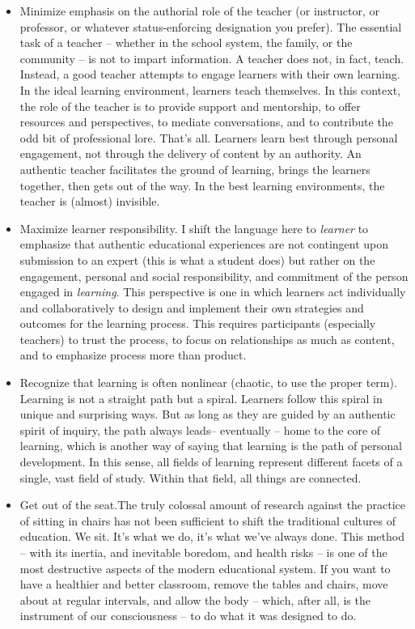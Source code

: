 \documentclass[10pt,DIV09,letterpaper,oneside,headsepline]{scrreprt}
\begin{document}
\begin{itemize}

\item Minimize emphasis on the authorial role of the teacher (or instructor, or professor, or whatever status-enforcing designation you prefer). The essential task of a teacher -- whether in the school system, the family, or the community -- is not to impart information. A teacher does not, in fact, teach. Instead, a good teacher attempts to engage learners with their own learning. In the ideal learning environment, learners teach themselves. In this context, the role of the teacher is to provide support and mentorship, to offer resources and perspectives, to mediate conversations, and to contribute the odd bit of professional lore. That’s all. Learners learn best through personal engagement, not through the delivery of content by an authority. An authentic teacher facilitates the ground of learning, brings the learners together, then gets out of the way. In the best learning environments, the teacher is (almost) invisible.

\item Maximize learner responsibility. I shift the language here to \textit{learner} to emphasize that authentic educational experiences are not contingent upon submission to an expert (this is what a student does) but rather on the engagement, personal and social responsibility, and commitment of the person engaged in \textit{learning}. This perspective is one in which learners act individually and collaboratively to design and implement their own strategies and outcomes for the learning process. This requires participants (especially teachers) to trust the process, to focus on relationships as much as content, and to emphasize process more than product.

\item Recognize that learning is often nonlinear (chaotic, to use the proper term). Learning is not a straight path but a spiral. Learners follow this spiral in unique and surprising ways. But as long as they are guided by an authentic spirit of inquiry, the path always leads-- eventually -- home to the core of learning, which is another way of saying that learning is the path of personal development. In this sense, all fields of learning represent different facets of a single, vast field of study. Within that field, all things are connected.

\item Get out of the seat.The truly colossal amount of research against the practice of sitting in chairs has not been sufficient to shift the traditional cultures of education. We sit. It's what we do, it's what we've always done. This method -- with its inertia, and inevitable boredom, and health risks -- is one of the most destructive aspects of the modern educational system. If you want to have a healthier and better classroom, remove the tables and chairs, move about at regular intervals, and allow the body -- which, after all, is the instrument of our consciousness -- to do what it was designed to do.


\end{itemize}
\end{document}
